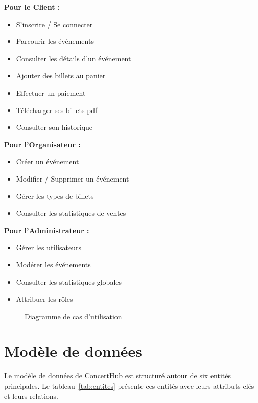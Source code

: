 \documentclass[a4paper,12pt,twoside]{report}
\begin{document}
\textbf{Pour le Client :}
\begin{itemize}
    \item S'inscrire / Se connecter
    \item Parcourir les événements
    \item Consulter les détails d'un événement
    \item Ajouter des billets au panier
    \item Effectuer un paiement
    \item Télécharger ses billets \gls{pdf}
    \item Consulter son historique
\end{itemize}

\textbf{Pour l'Organisateur :}
\begin{itemize}
    \item Créer un événement
    \item Modifier / Supprimer un événement
    \item Gérer les types de billets
    \item Consulter les statistiques de ventes
\end{itemize}

\textbf{Pour l'Administrateur :}
\begin{itemize}
    \item Gérer les utilisateurs
    \item Modérer les événements
    \item Consulter les statistiques globales
    \item Attribuer les rôles
\end{itemize}

\begin{figure}[!h]
    \centering
    \caption{Diagramme de cas d'utilisation}
    \label{fig:usecase}
\end{figure}

\section{Modèle de données}

Le modèle de données de ConcertHub est structuré autour de six entités principales. Le tableau~\ref{tab:entites} présente ces entités avec leurs attributs clés et leurs relations.
\end{document}
